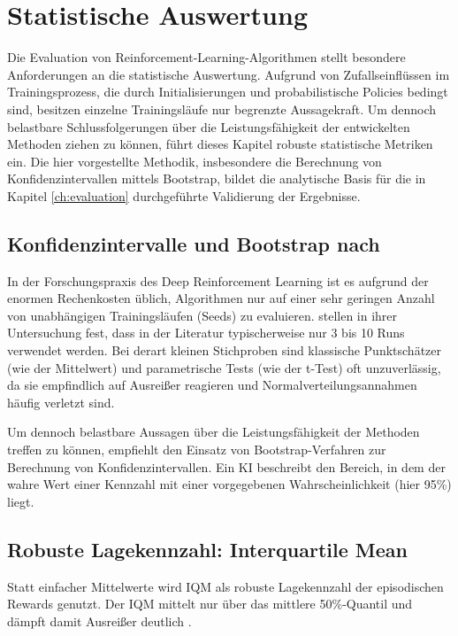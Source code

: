 \chapter{Statistische Auswertung}
\label{ch:Statistische_Auswertung}

Die Evaluation von Reinforcement-Learning-Algorithmen stellt besondere Anforderungen an die statistische Auswertung. Aufgrund von Zufallseinflüssen im Trainingsprozess, die durch Initialisierungen und probabilistische Policies bedingt sind, besitzen einzelne Trainingsläufe nur begrenzte Aussagekraft. Um dennoch belastbare Schlussfolgerungen über die Leistungsfähigkeit der entwickelten Methoden ziehen zu können, führt dieses Kapitel robuste statistische Metriken ein. Die hier vorgestellte Methodik, insbesondere die Berechnung von Konfidenzintervallen mittels Bootstrap, bildet die analytische Basis für die in Kapitel \ref{ch:evaluation} durchgeführte Validierung der Ergebnisse.

\section{Konfidenzintervalle und Bootstrap nach \texorpdfstring{\citet{statistical_rl_evaluation}}{Agarwal et al.}}

In der Forschungspraxis des Deep Reinforcement Learning ist es aufgrund der enormen Rechenkosten üblich, Algorithmen nur auf einer sehr geringen Anzahl von unabhängigen Trainingsläufen (Seeds) zu evaluieren. \citet{statistical_rl_evaluation} stellen in ihrer Untersuchung fest, dass in der Literatur typischerweise nur 3 bis 10 Runs verwendet werden. Bei derart kleinen Stichproben sind klassische Punktschätzer (wie der Mittelwert) und parametrische Tests (wie der t-Test) oft unzuverlässig, da sie empfindlich auf Ausreißer reagieren und Normalverteilungsannahmen häufig verletzt sind.
\medskip

Um dennoch belastbare Aussagen über die Leistungsfähigkeit der Methoden treffen zu können, empfiehlt \citet{statistical_rl_evaluation} den Einsatz von Bootstrap-Verfahren zur Berechnung von Konfidenzintervallen. Ein \ac{KI} beschreibt den Bereich, in dem der wahre Wert einer Kennzahl mit einer vorgegebenen Wahrscheinlichkeit (hier 95\%) liegt.

\section*{Robuste Lagekennzahl: Interquartile Mean}
Statt einfacher Mittelwerte wird \ac{IQM} als robuste Lagekennzahl der episodischen Rewards genutzt. Der \ac{IQM} mittelt nur über das mittlere 50\%-Quantil und dämpft damit Ausreißer deutlich \citep{statistical_rl_evaluation}.

